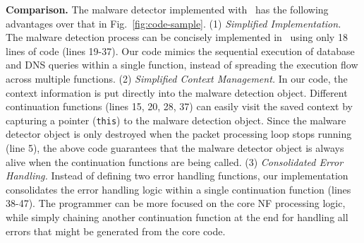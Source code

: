 

\noindent\textbf{Comparison.} The malware detector implemented with \netstar~has the following advantages over that in Fig.~\ref{fig:code-sample}.
(1) {\em Simplified Implementation.} The malware detection process can be concisely implemented in \netstar~using only 18 lines of code (lines 19-37). Our code mimics the sequential execution of database and DNS queries within a single function, instead of spreading the execution flow across multiple functions.
(2) {\em Simplified Context Management.} In our code, the context information is put directly into the malware detection object. Different continuation functions (lines 15, 20, 28, 37) can easily visit the saved context by capturing a pointer (\lstinline[style=InlineStyle]{this}) to the malware detection object. Since the malware detector object is only destroyed when the packet processing loop stops running (line 5), the above code guarantees that the malware detector object is always alive when the continuation functions are being called.
(3) {\em Consolidated Error Handling.} Instead of defining two error handling functions, our implementation consolidates the error handling logic within a single continuation function (lines 38-47). %
The programmer can be more focused on the core NF processing logic, while simply chaining another continuation function at the end for handling all errors that might be generated from the core code.



